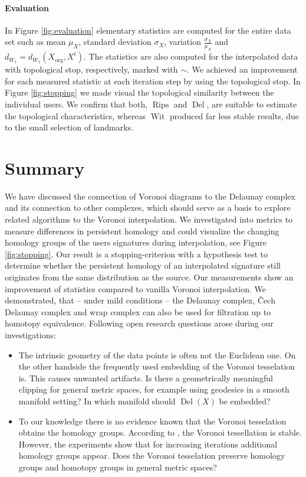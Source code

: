 \documentclass{article}
\DeclareMathOperator{\Rips}{\text{Rips}}
\DeclareMathOperator{\Del}{\text{Del}}
\DeclareMathOperator{\Wit}{\text{Wit}}
\begin{document}
\paragraph{Evaluation} In Figure \ref{fig:evaluation} elementary statistics are computed for the entire data set such as mean $\mu_X$, standard deviation $\sigma_X$, variation $\frac{\sigma_X}{\mu_X}$ and $d_{W_1} = d_{W_1}(X_{\text{org}},X^{t})$. The statistics are also computed for the interpolated data with topological stop, respectively, marked with $\sim$. We achieved an improvement for each measured statistic at each iteration step by using the topological stop. In Figure \ref{fig:stopping} we made visual the topological similarity between the individual users. We confirm that both, $\Rips$ and $\Del$, are suitable to estimate the topological characteristics, whereas $\Wit$ produced far less stable results, due to the small selection of landmarks.


\section{Summary}
\label{sec:conclusion}
We have discussed the connection of Voronoi diagrams to the Delaunay complex and its connection to other complexes, which should serve as a basis to explore related algorithms to the Voronoi interpolation. We investigated into metrics to measure differences in persistent homology and could visualize the changing homology groups of the users signatures during interpolation, see Figure \ref{fig:stopping}.
Our result is a stopping-criterion with a hypothesis test to determine whether the persistent homology of an interpolated signature still originates from the same distribution as the source. Our measurements show an improvement of statistics compared to vanilla Voronoi interpolation. We demonstrated, that -- under mild conditions -- the Delaunay complex, \v{C}ech Delaunay complex and wrap complex can also be used for filtration up to homotopy equivalence. Following open research questions arose during our investigations:
\begin{itemize}
  \item The intrinsic geometry of the data points is often not the Euclidean one. On the other handside the frequently used embedding of the Voronoi tesselation is. This causes unwanted artifacts. Is there a geometrically meaningful clipping for general metric spaces, for example using geodesics in a smooth manifold setting? In which manifold should $\Del(X)$ be embedded?
  \item To our knowledge there is no evidence known that the Voronoi tesselation obtains the homology groups. According to \cite{reem2011geometric}, the Voronoi tessellation is stable. However, the experiments show that for increasing iterations additional homology groups appear. Does the Voronoi tesselation preserve homology groups and homotopy groups in general metric spaces?
\end{itemize}
\end{document}
